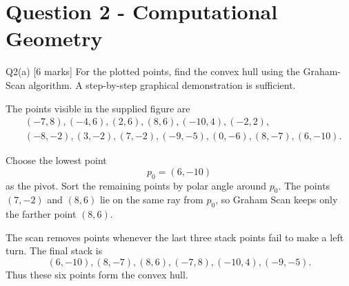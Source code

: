 \documentclass[10.5pt,a4paper]{article}
\begin{document}
\section{Question 2 - Computational Geometry}

\begin{questionbox}{Q2(a) [6 marks]}
For the plotted points, find the convex hull using the Graham-Scan algorithm. A step-by-step graphical demonstration is sufficient.
\end{questionbox}

\begin{answerbox}
The points visible in the supplied figure are
\[
\begin{aligned}
&(-7,8),(-4,6),(2,6),(8,6),(-10,4),(-2,2),\\
&(-8,-2),(3,-2),(7,-2),(-9,-5),(0,-6),(8,-7),(6,-10).
\end{aligned}
\]

Choose the lowest point
\[
p_0=(6,-10)
\]
as the pivot. Sort the remaining points by polar angle around \(p_0\). The points \((7,-2)\) and \((8,6)\) lie on the same ray from \(p_0\), so Graham Scan keeps only the farther point \((8,6)\).

The scan removes points whenever the last three stack points fail to make a left turn. The final stack is
\[
\boxed{(6,-10),(8,-7),(8,6),(-7,8),(-10,4),(-9,-5)}.
\]
Thus these six points form the convex hull.

\begin{center}
\end{center}
\end{answerbox}
\end{document}

